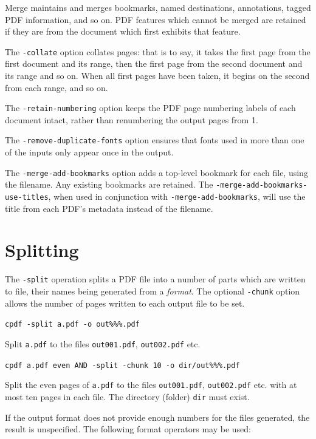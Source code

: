 \documentclass{book}
\begin{document}
\noindent Merge maintains and merges bookmarks, named destinations, annotations, tagged PDF information, and so on. PDF features which cannot be merged are retained if they are from
the document which first exhibits that feature.

The \texttt{-collate} option collates pages: that is to say, it takes the first page from the first document and its range, then the first page from the second document and its range and so on. When all first pages have been taken, it begins on the second from each range, and so on.

The \texttt{-retain-numbering} option keeps the PDF page numbering labels of
each document intact, rather than renumbering the output pages from 1.

The \texttt{-remove-duplicate-fonts} option ensures that fonts used in more than one
of the inputs only appear once in the output.

The \texttt{-merge-add-bookmarks} option adds a top-level bookmark for each file, using the filename. Any existing bookmarks are retained. The \texttt{-merge\--add\--bookmarks\--use\--titles}, when used in conjunction with \texttt{-merge-add-bookmarks}, will use the title from each PDF's metadata instead of the filename.

  \section{Splitting}
   The \texttt{-split} operation splits a PDF file into a number of parts which
are written to file, their names being generated from a \emph{format}. The
optional \texttt{-chunk} option allows the number of pages written to each
output file to be set. 
  \begin{framed}\small
    \noindent\verb!cpdf -split a.pdf -o out%%%.pdf!

    \vspace{2.5mm}
    \noindent Split \texttt{a.pdf} to the files \texttt{out001.pdf}, \texttt{out002.pdf} etc.

    \vspace{2.5mm}
    \noindent\verb!cpdf a.pdf even AND -split -chunk 10 -o dir/out%%%.pdf!

    \vspace{2.5mm}
    \noindent Split the even pages of \texttt{a.pdf} to the files
\texttt{out001.pdf}, \texttt{out002.pdf} etc. with at most ten pages in each
file. The directory (folder) \texttt{dir} must exist.
  \end{framed}
\noindent If the output format does not provide enough numbers for the files generated,
the result is unspecified. The following format operators may be used:
\end{document}

